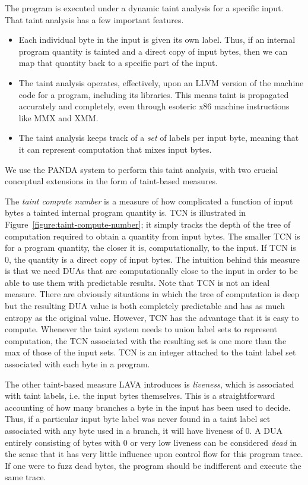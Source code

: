 The program is executed under a dynamic taint analysis for a specific input.
That taint analysis has a few important features.
\begin{itemize}
\item Each individual byte in the input is given its own label.
Thus, if an internal program quantity is tainted and a direct copy of input bytes, then we can map that quantity back to a specific part of the input.  
\item The taint analysis operates, effectively, upon an LLVM version of the machine code for a program, including its libraries.
This means taint is propagated accurately and completely, even through esoteric x86 machine instructions like MMX and XMM.
\item The taint analysis keeps track of a \emph{set} of labels per input byte, meaning that it can represent computation that mixes input bytes.
\end{itemize}
We use the PANDA system to perform this taint analysis, with two crucial conceptual extensions in the form of taint-based measures.

The \emph{taint compute number} is a measure of how complicated a function of input bytes a tainted internal program quantity is.
TCN is illustrated in Figure~\ref{figure:taint-compute-number}; it simply tracks the depth of the tree of computation required to obtain 
a quantity from input bytes.
The smaller TCN is for a program quantity, the closer it is, computationally, to the input.
If TCN is 0, the quantity is a direct copy of input bytes.
The intuition behind this measure is that we need DUAs that are computationally close to the input in order to be able to use them with predictable results.
Note that TCN is not an ideal measure.
There are obviously situations in which the tree of computation is deep but the resulting DUA value is both completely predictable and has as much entropy as the original value.
However, TCN has the advantage that it is easy to compute.
Whenever the taint system needs to union label sets to represent computation, the TCN associated with the resulting set is one more than the max of those of the 
input sets.
TCN is an integer attached to the taint label set associated with each byte in a program.

The other taint-based measure LAVA introduces is \emph{liveness}, which is associated with taint labels, i.e. the input bytes themselves.
This is a straightforward accounting of how many branches a byte in the input has been used to decide.
Thus, if a particular input byte label was never found in a taint label set associated with any byte used in a branch, it will have liveness of 0.
A DUA entirely consisting of bytes with 0 or very low liveness can be considered \emph{dead} in the sense that it has very little influence upon control flow for this program trace.
If one were to fuzz dead bytes, the program should be indifferent and execute the same trace.  

